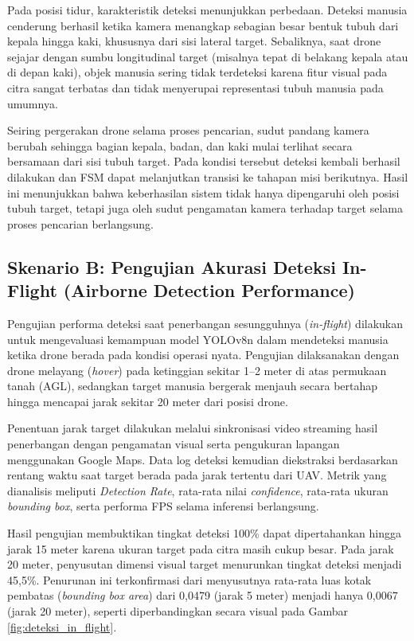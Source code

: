Pada posisi tidur, karakteristik deteksi menunjukkan perbedaan. Deteksi manusia cenderung berhasil ketika kamera menangkap sebagian besar bentuk tubuh dari kepala hingga kaki, khususnya dari sisi lateral target. Sebaliknya, saat drone sejajar dengan sumbu longitudinal target (misalnya tepat di belakang kepala atau di depan kaki), objek manusia sering tidak terdeteksi karena fitur visual pada citra sangat terbatas dan tidak menyerupai representasi tubuh manusia pada umumnya.

Seiring pergerakan drone selama proses pencarian, sudut pandang kamera berubah sehingga bagian kepala, badan, dan kaki mulai terlihat secara bersamaan dari sisi tubuh target. Pada kondisi tersebut deteksi kembali berhasil dilakukan dan FSM dapat melanjutkan transisi ke tahapan misi berikutnya. Hasil ini menunjukkan bahwa keberhasilan sistem tidak hanya dipengaruhi oleh posisi tubuh target, tetapi juga oleh sudut pengamatan kamera terhadap target selama proses pencarian berlangsung.


\subsection{Skenario B: Pengujian Akurasi Deteksi In-Flight (Airborne Detection Performance)}

Pengujian performa deteksi saat penerbangan sesungguhnya (\textit{in-flight}) dilakukan untuk mengevaluasi kemampuan model YOLOv8n dalam mendeteksi manusia ketika drone berada pada kondisi operasi nyata. Pengujian dilaksanakan dengan drone melayang (\textit{hover}) pada ketinggian sekitar 1--2 meter di atas permukaan tanah (AGL), sedangkan target manusia bergerak menjauh secara bertahap hingga mencapai jarak sekitar 20 meter dari posisi drone.

Penentuan jarak target dilakukan melalui sinkronisasi video streaming hasil penerbangan dengan pengamatan visual serta pengukuran lapangan menggunakan Google Maps. Data log deteksi kemudian diekstraksi berdasarkan rentang waktu saat target berada pada jarak tertentu dari UAV. Metrik yang dianalisis meliputi \textit{Detection Rate}, rata-rata nilai \textit{confidence}, rata-rata ukuran \textit{bounding box}, serta performa FPS selama inferensi berlangsung.

Hasil pengujian membuktikan tingkat deteksi 100\% dapat dipertahankan hingga jarak 15 meter karena ukuran target pada citra masih cukup besar. Pada jarak 20 meter, penyusutan dimensi visual target menurunkan tingkat deteksi menjadi 45,5\%. Penurunan ini terkonfirmasi dari menyusutnya rata-rata luas kotak pembatas (\textit{bounding box area}) dari 0,0479 (jarak 5 meter) menjadi hanya 0,0067 (jarak 20 meter), seperti diperbandingkan secara visual pada Gambar \ref{fig:deteksi_in_flight}.


